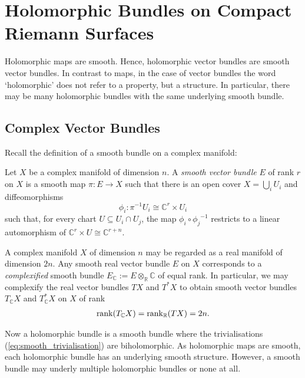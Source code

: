\documentclass[12pt]{ociamthesis}  %
\begin{document}
\section{Holomorphic Bundles on Compact Riemann Surfaces}

Holomorphic maps are smooth. Hence, holomorphic vector bundles
are smooth vector bundles. In contrast to maps, in the case of vector
bundles the word `holomorphic' does not refer to a property, but
a structure. In particular, there may be many holomorphic bundles with
the same underlying smooth bundle.

\subsection{Complex Vector Bundles}

Recall the definition of a smooth bundle on a complex
manifold:

\begin{definition}\label{def:complex_bundle}
  Let $X$ be a complex manifold of dimension $n$. A
  \emph{smooth vector bundle} $E$ of rank $r$ on $X$ is a smooth map
  $\pi : E\to X$ such that there
  is an open cover $X = \bigcup_i U_i$ and diffeomorphisms
  \begin{equation}\label{eq:smooth_trivialisation}
    \phi_i : {\pi}^{-1}U_i \cong \mathbb{C}^r \times U_i
  \end{equation}
  such that, for every chart $U\subseteq U_i\cap U_j$, the
  map $\phi_i \circ {\phi_j}^{-1}$ restricts to a linear
  automorphism of $\mathbb{C}^r\times U \cong \mathbb{C}^{r+n}$.
\end{definition}

\begin{example}
  A complex manifold $X$ of dimension $n$ may be regarded as a
  real manifold of dimension $2n$. Any smooth real vector bundle
  $E$ on $X$ corresponds to a \emph{complexified} smooth bundle
  $E_{\mathbb{C}} := E\otimes_{\mathbb{R}} \mathbb{C}$ of equal rank.
  In particular, we may complexify the real vector bundles
  $TX$ and $T^*X$ to obtain smooth vector bundles
  $T_{\mathbb{C}} X$ and $T_{\mathbb{C}}^*X$
  on $X$ of rank
  \begin{align*}
    \operatorname{rank}(T_\mathbb{C} X)
    = \operatorname{rank}_{\mathbb{R}} (TX) = 2n.
  \end{align*}
\end{example}

Now a holomorphic bundle is a smooth bundle where the trivialisations
(\ref{eq:smooth_trivialisation}) are biholomorphic. As holomorphic
maps are smooth, each holomorphic bundle has an underlying smooth
structure. However, a smooth bundle may underly multiple holomorphic
bundles or none at all.
\end{document}
